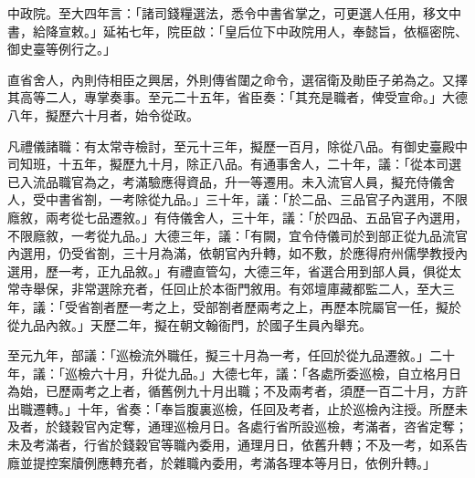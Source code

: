 \begin{pinyinscope}
 中政院。至大四年言：「諸司錢糧選法，悉令中書省掌之，可更選人任用，移文中書，給降宣敕。」延祐七年，院臣啟：「皇后位下中政院用人，奉懿旨，依樞密院、御史臺等例行之。」



 直省舍人，內則侍相臣之興居，外則傳省闥之命令，選宿衛及勛臣子弟為之。又擇其高等二人，專掌奏事。至元二十五年，省臣奏：「其充是職者，俾受宣命。」大德八年，擬歷六十月者，始令從政。



 凡禮儀諸職：有太常寺檢討，至元十三年，擬歷一百月，除從八品。有御史臺殿中司知班，十五年，擬歷九十月，除正八品。有通事舍人，二十年，議：「從本司選已入流品職官為之，考滿驗應得資品，升一等遷用。未入流官人員，擬充侍儀舍人，受中書省劄，一考除從九品。」三十年，議：「於二品、三品官子內選用，不限廕敘，兩考從七品遷敘。」有侍儀舍人，三十年，議：「於四品、五品官子內選用，不限廕敘，一考從九品。」大德三年，議：「有闕，宜令侍儀司於到部正從九品流官內選用，仍受省劄，三十月為滿，依朝官內升轉，如不敷，於應得府州儒學教授內選用，歷一考，正九品敘。」有禮直管勾，大德三年，省選合用到部人員，俱從太常寺舉保，非常選除充者，任回止於本衙門敘用。有郊壇庫藏都監二人，至大三年，議：「受省劄者歷一考之上，受部劄者歷兩考之上，再歷本院屬官一任，擬於從九品內敘。」天歷二年，擬在朝文翰衙門，於國子生員內舉充。



 至元九年，部議：「巡檢流外職任，擬三十月為一考，任回於從九品遷敘。」二十年，議：「巡檢六十月，升從九品。」大德七年，議：「各處所委巡檢，自立格月日為始，已歷兩考之上者，循舊例九十月出職；不及兩考者，須歷一百二十月，方許出職遷轉。」十年，省奏：「奉旨腹裏巡檢，任回及考者，止於巡檢內注授。所歷未及者，於錢穀官內定奪，通理巡檢月日。各處行省所設巡檢，考滿者，咨省定奪；未及考滿者，行省於錢穀官等職內委用，通理月日，依舊升轉；不及一考，如系告廕並提控案牘例應轉充者，於雜職內委用，考滿各理本等月日，依例升轉。」




\end{pinyinscope}
